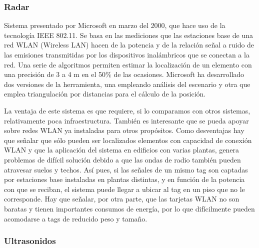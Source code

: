 \subsubsection{Radar}

Sistema presentado por Microsoft en marzo del 2000, que hace uso de la tecnología IEEE 802.11. Se basa en las mediciones que las estaciones base de una red WLAN (Wireless LAN) hacen de la potencia y de la relación señal a ruido de las emisiones transmitidas por los dispositivos inalámbricos que se conectan a la red. Una serie de algoritmos permiten estimar la localización de un elemento con una precisión de 3 a 4 m en el 50\% de las ocasiones. Microsoft ha desarrollado dos versiones de la herramienta, una empleando análisis del escenario y otra que emplea triangulación por distancias para el cálculo de la posición. 

La ventaja de este sistema es que requiere, si lo comparamos con otros sistemas, relativamente poca infraestructura. También es interesante que se pueda apoyar sobre redes WLAN ya instaladas para otros propósitos. Como desventajas hay que señalar que sólo pueden ser localizados elementos con capacidad de conexión WLAN y que la aplicación del sistema en edificios con varias plantas, genera problemas de difícil solución debido a que las ondas de radio también pueden atravesar suelos y techos. Así pues, si las señales de un mismo tag son captadas por estaciones base instaladas en plantas distintas, y en función de la potencia con que se reciban, el sistema puede llegar a ubicar al tag en un piso que no le corresponde. Hay que señalar, por otra parte, que las tarjetas WLAN no son baratas y tienen importantes consumos de energía, por lo que difícilmente pueden acomodarse a tags de reducido peso y tamaño. 

\subsubsection{Ultrasonidos}

